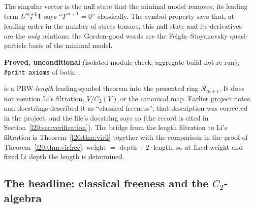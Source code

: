 \begin{physics}
The singular vector is the null state that the minimal model removes; its leading term $L_{-2}^{m+1}\mathbf{1}$ says
``$T^{m+1}=0$'' classically. The symbol property says that, at leading order in the number of stress tensors, this
null state and its derivatives are the \emph{only} relations: the Gordon-good words are the Feigin--Stoyanovsky
quasi-particle basis of the minimal model.
\end{physics}

\begin{status}
\textbf{Proved, unconditional} (isolated-module check; aggregate build not re-run); \texttt{\#print axioms} of both: .
\end{status}

\begin{warning}[title={Recorded overclaim: \texttt{virSymbol\_twoSeries} is not by itself classical freeness}]
 is a PBW-\emph{length} leading-symbol theorem into the presented ring $\mathcal R_{m+1}$. It does not
mention Li's filtration, $V/C_2(V)$ or the canonical map. Earlier project notes and docstrings described it as
``classical freeness''; that description was corrected in the project, and the file's docstring says so (the record is cited in
Section~\ref{l20:sec:verification}). The bridge from the length filtration to Li's filtration is Theorem~\ref{l20:thm:virli} together with the
comparison in the proof of Theorem~\ref{l20:thm:virfree}: weight $=$ depth $+\,2\cdot$length, so at fixed weight and fixed
Li depth the length is determined.
\end{warning}

\subsection{The headline: classical freeness and the \texorpdfstring{$C_2$}{C2}-algebra}

